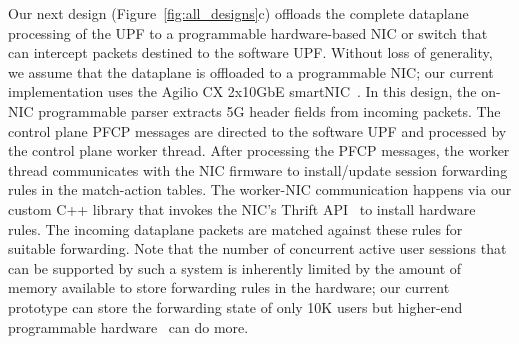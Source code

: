 Our next design (Figure~\ref{fig:all_designs}c) offloads the complete dataplane processing of the UPF to a programmable hardware-based NIC or switch that can intercept packets destined to the software UPF. Without loss of generality, we assume that the dataplane is offloaded to a programmable NIC; our current implementation uses the Agilio CX 2x10GbE smartNIC~\cite{netronome}. In this design, the on-NIC programmable parser extracts 5G header fields from incoming packets. The control plane PFCP messages are directed to the software UPF and processed by the control plane worker thread. After processing the PFCP messages, the worker thread communicates with the NIC firmware to install/update session forwarding rules in the match-action tables. The worker-NIC communication happens via our custom C++ library that invokes the NIC's Thrift API~\cite{thrift-api} to install hardware rules. The incoming dataplane packets are matched against these rules for suitable forwarding. Note that the number of concurrent active user sessions that can be supported by such a system is inherently limited by the amount of memory available to store forwarding rules in the hardware; our current prototype can store the forwarding state of only 10K users but higher-end programmable hardware~\cite{tofino} can do more.

